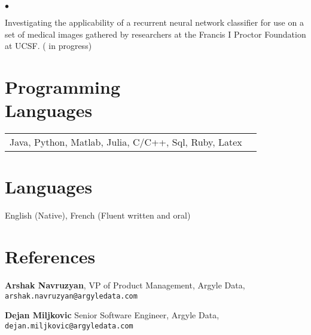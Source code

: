 \documentclass[margin,line,pifont,palatino,courier]{res}
\newenvironment{list1}{
  \begin{list}{\label{}}{%
      \setlength{\itemsep}{0in}
      \setlength{\parsep}{0in} \setlength{\parskip}{0in}
      \setlength{\topsep}{0in} \setlength{\partopsep}{0in}
      \setlength{\leftmargin}{0.0in}}}{\end{list}}
\newenvironment{list2}{
  \begin{list}{$\bullet$}{%
      \setlength{\itemsep}{0in}
      \setlength{\parsep}{0in} \setlength{\parskip}{0in}
      \setlength{\topsep}{0in} \setlength{\partopsep}{0in}
      \setlength{\leftmargin}{0.2in}}}{\end{list}}
\begin{document}
\begin{resume}
\begin{list2}
  \item Investigating the applicability of a recurrent neural network classifier for use on a set of medical images gathered by researchers at the Francis I Proctor Foundation at UCSF. ( in progress)
\end{list2}



\section{\sc Programming\\ Languages}

\begin{tabular}{@{}p{6in}p{3in}}

Java, Python, Matlab, Julia,  C/C++, Sql, Ruby, Latex \\


\end{tabular}


\section{\sc  Languages}
  English (Native), French (Fluent written and oral)


\section{\sc   References}

\begin{list1}
\item {\bf Arshak Navruzyan}, VP of Product Management, Argyle Data, \texttt{arshak.navruzyan@argyledata.com}

\item {\bf Dejan Miljkovic}  Senior Software Engineer, Argyle Data, \texttt{dejan.miljkovic@argyledata.com} 
 
\end{list1}


\end{resume}
\end{document}
